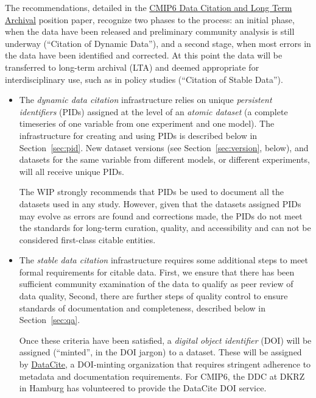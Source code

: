 \documentclass[gmd,manuscript]{copernicus}
\newcommand{\secref}[1] {\mbox{Section  \ref{sec:#1}}}
\begin{document}
The recommendations, detailed in the
\href{https://goo.gl/CZyWq1}{CMIP6 Data Citation and Long Term 
Archival} position paper, recognize two phases to the process: an
initial phase, when the data have been released and preliminary
community analysis is still underway (``Citation of Dynamic Data''),
and a second stage, when most errors in the data have been identified
and corrected. At this point the data will be transferred to long-term
archival (LTA) and deemed appropriate for interdisciplinary
use, such as in policy studies (``Citation of Stable Data'').

\begin{itemize}
\item The \emph{dynamic data citation} infrastructure relies on
unique \emph{persistent identifiers} (PIDs)
  assigned at the level of an \emph{atomic dataset} (a complete
  timeseries of one variable from one experiment and one model). The
  infrastructure for creating and using PIDs is described below in
  \secref{pid}. New dataset versions (see \secref{version}, below),
  and datasets for the same variable from different models, or
  different experiments, will all receive unique PIDs.

  The WIP strongly recommends that PIDs be used to document all the
  datasets used in any study. However, given that the datasets assigned
  PIDs may evolve as errors are found and corrections made, the PIDs
  do not meet the standards for long-term curation, quality, and 
  accessibility and can not be considered first-class citable entities.
\item The \emph{stable data citation} infrastructure requires some
  additional steps to meet formal requirements for citable data. First, we
  ensure that there has been sufficient community examination of the
  data to qualify as peer review of data quality, Second, there are
  further steps of quality control to ensure standards of
  documentation and completeness, described below in \secref{qa}.

  Once these criteria have been satisfied, a \emph{digital object 
  identifier} (DOI) will be assigned (``minted'', in the DOI jargon)
  to a dataset. These will be assigned by
  \href{https://www.datacite.org/dois.html}{DataCite}, a DOI-minting
  organization that requires stringent adherence to metadata and
  documentation requirements. For CMIP6, the DDC at DKRZ in Hamburg
  has volunteered to provide the DataCite DOI service.


\end{itemize}
\end{document}
